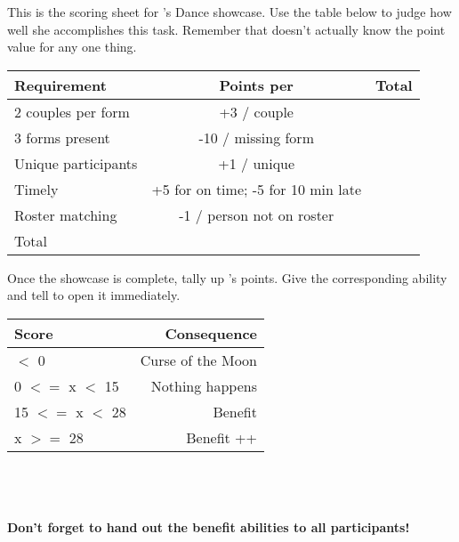 \documentclass[green]{NeptuneBall}
\begin{document}
\name{\gDanceScoring{}}

This is the scoring sheet for \cPrincess{}'s Dance showcase. Use the table below to judge how well she accomplishes this task. Remember that \cPrincess{\they} doesn't actually know the point value for any one thing.

\begin{tabular}{| l | c | r |}
  \hline
  Requirement & Points per & Total \\ \hline \hline
  2 couples per form & +3 / couple & \hspace{2cm} \\ \hline
  3 forms present & -10 / missing form & \hspace{2cm} \\ \hline
  Unique participants & +1 / unique & \hspace{2cm} \\ \hline
  Timely & +5 for on time; -5 for 10 min late & \hspace{2cm} \\ \hline
  Roster matching & -1 / person not on roster & \hspace{2cm} \\ \hline \hline
  Total & & \hspace{2cm} \\ \hline
\end{tabular}

Once the showcase is complete, tally up \cPrincess{}'s points. Give \cPrincess{\them} the corresponding ability and tell \cPrincess{\them} to open it immediately.
  
\begin{tabular}{| l | r|}
 \hline
 Score & Consequence \\ \hline \hline
 $<$ 0 & Curse of the Moon \\ \hline
 0 $<=$ x $<$ 15 & Nothing happens \\ \hline
 15 $<=$ x $<$ 28 & Benefit \\ \hline
 x  $>=$ 28 & Benefit ++ \\ \hline
\end{tabular}
\\
\\
\\
{\bf Don't forget to hand out the benefit abilities to all participants!}
\end{document}

